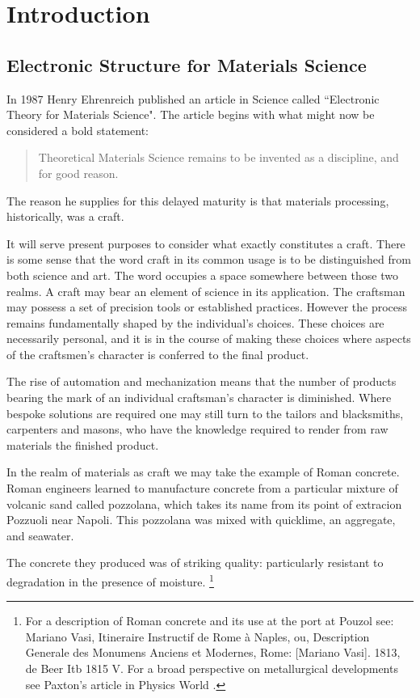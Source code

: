 \chapter{Introduction}
\section{Electronic Structure for Materials Science}
In 1987 Henry Ehrenreich published an article in Science called
``Electronic Theory for Materials Science". The article begins
with what might now be considered a bold statement:

\begin{quote}
Theoretical Materials Science remains to be invented as a discipline, and for good reason.
\end{quote}

The reason he supplies for this delayed maturity is that materials processing, 
historically, was a craft.

It will serve present purposes to consider what exactly constitutes a craft. 
There is some sense that the word craft in its common usage 
is to be distinguished from both science and art.
The word occupies a space somewhere between those two realms. 
A craft may bear an element of science in its application. 
The craftsman may possess a set of precision tools or 
established practices. However the process remains fundamentally shaped by 
the individual's choices. These choices are necessarily personal,
and it is in the course of making these choices where aspects 
of the craftsmen's character is conferred to the final product. 

The rise of automation and mechanization means that the 
number of products bearing the mark of an individual craftsman's 
character is diminished. Where bespoke solutions are 
required one may still turn to the tailors and blacksmiths, 
carpenters and masons, who have the knowledge 
required to render from raw materials the finished product.


In the realm of materials as craft we may take the example of Roman concrete.
%
Roman engineers learned to manufacture concrete from a 
particular mixture of volcanic sand called pozzolana, which
takes its name from its point of extracion Pozzuoli near Napoli. 
%
This pozzolana was mixed with quicklime, an aggregate, and seawater.

The concrete they produced was of striking quality: 
particularly resistant to degradation in the presence of moisture.
%
%
\footnote{For a description of Roman concrete and its use at the port at Pouzol see: Mariano Vasi, 
Itineraire Instructif de Rome à Naples, ou, Description Generale des Monumens Anciens et Modernes, 
Rome: [Mariano Vasi]. 1813, de Beer Itb 1815 V. For a broad perspective on metallurgical developments
see Paxton's article in Physics World \cite{paxton92}.} 

